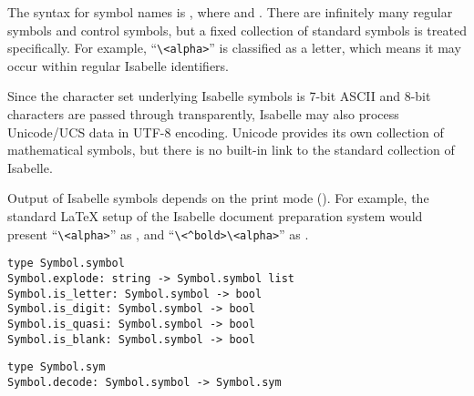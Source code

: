 \begin{isabellebody}
\begin{isamarkuptext}
\begin{enumerate}
  \end{enumerate}

  \noindent The  syntax for symbol names is , where  and .  There are infinitely many
  regular symbols and control symbols, but a fixed collection of
  standard symbols is treated specifically.  For example,
  ``\verb,\,\verb,<alpha>,'' is classified as a letter, which means it
  may occur within regular Isabelle identifiers.

  Since the character set underlying Isabelle symbols is 7-bit ASCII
  and 8-bit characters are passed through transparently, Isabelle may
  also process Unicode/UCS data in UTF-8 encoding.  Unicode provides
  its own collection of mathematical symbols, but there is no built-in
  link to the standard collection of Isabelle.

  \medskip Output of Isabelle symbols depends on the print mode
  ().  For example, the standard {\LaTeX} setup of the
  Isabelle document preparation system would present
  ``\verb,\,\verb,<alpha>,'' as \isa{{\isasymalpha}}, and
  ``\verb,\,\verb,<^bold>,\verb,\,\verb,<alpha>,'' as \isa{\isactrlbold {\isasymalpha}}.%
\end{isamarkuptext}%
\isamarkuptrue%
%
\isadelimmlref
%
\endisadelimmlref
%
\isatagmlref
%
\begin{isamarkuptext}%
\begin{mldecls}
  \verb|type Symbol.symbol| \\
  \verb|Symbol.explode: string -> Symbol.symbol list| \\
  \verb|Symbol.is_letter: Symbol.symbol -> bool| \\
  \verb|Symbol.is_digit: Symbol.symbol -> bool| \\
  \verb|Symbol.is_quasi: Symbol.symbol -> bool| \\
  \verb|Symbol.is_blank: Symbol.symbol -> bool| \\
  \end{mldecls}
  \begin{mldecls}
  \verb|type Symbol.sym| \\
  \verb|Symbol.decode: Symbol.symbol -> Symbol.sym| \\
  \end{mldecls}


\end{isamarkuptext}
\end{isabellebody}
